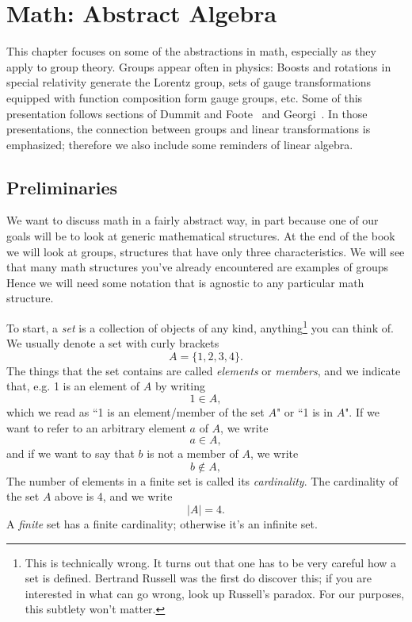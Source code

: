 \chapter{Math: Abstract Algebra}\label{ch:group}
This chapter focuses on some of the abstractions in math, especially
as they apply to group theory. 
Groups appear often in physics:
Boosts and rotations in special relativity 
generate the Lorentz group, sets of gauge transformations equipped with 
function composition form gauge groups, etc. Some of this presentation
follows sections of Dummit and Foote~\cite{dummit_abstract_2004} and 
Georgi~\cite{georgi_lie_1999}.
In those presentations, the connection between groups and linear
transformations is emphasized; therefore we also include
some reminders of linear algebra.


\section{Preliminaries}


We want to discuss math in a fairly abstract way, in part because one of our
goals will be to look at generic mathematical structures. At the end of the book
we will look at groups, structures that have only three characteristics. We will
see that many math structures you've already encountered are examples of
groups
Hence we will need some notation that is agnostic to any particular math
structure.


To start, a {\it set} is a collection of objects of
any kind, anything\footnote{This is technically wrong. It turns out that one has
to be very careful how a set is defined. Bertrand Russell was the first do
discover this; if you are interested in what can go wrong, look up
Russell's
paradox. For our purposes, this subtlety won't matter.}
you can think of. We usually denote a set
with curly brackets
\begin{equation}
A=\{1,2,3,4\}.
\end{equation}
The things that the set contains are called {\it elements}
or {\it members}, and we indicate that, e.g. 1 is an element of
$A$ by writing
\begin{equation}
1\in A,
\end{equation}
which we read as ``1 is an element/member of the set $A$" or ``1 is in $A$".
If we want to refer to an arbitrary element $a$ of $A$, we write
\begin{equation}
a\in A,
\end{equation}
and if we want to say that $b$ is not a member of $A$, we write
\begin{equation}
b\notin A,
\end{equation}
The number of elements in a finite set is called its
{\it cardinality}. The cardinality of the set $A$ above is 4, and we write
\begin{equation}
  |A|=4.
\end{equation}
A {\it finite} set has a finite cardinality; otherwise it's an infinite set.


